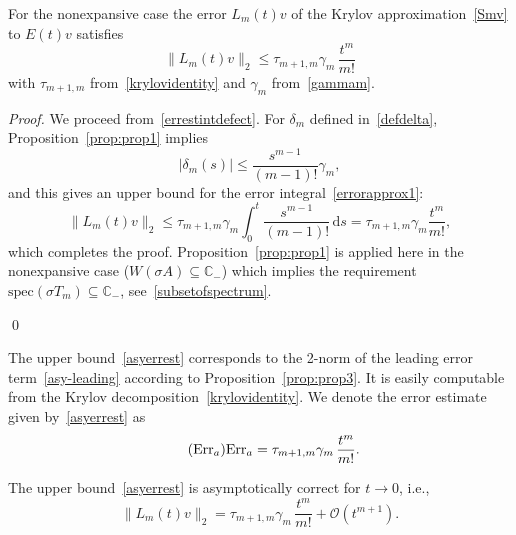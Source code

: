 \documentclass[smallextended]{svjour3pre}%
\numberwithin{equation}{section}
\numberwithin{figure}{section}
\numberwithin{table}{section}
\newcommand{\C}{\mathbb C}%
\newcommand{\divdif}[2]{#2[#1]}
\newcommand\tjnew[1]{{#1}}
\newcommand{\dd}{\mathrm{d}}
\newcommand{\ee}{{\rm e}}
\newcommand{\ii}{{\rm i}}
\newcommand\Era{\mathrm{Err}_a}
\newcommand\sca{\sigma}
\begin{document}
\begin{theorem}\label{theorem:upperboundexp}

\noindent
For the nonexpansive case the error $ L_m(t)v $ of the Krylov approximation~\eqref{Smv}
to $ E(t)v $ satisfies
\begin{equation} \label{asyerrest}
\| L_m(t)v \|_2 \leq \tau_{m+1,m}\gamma_m\,\frac{t^{m}}{m!}
\end{equation}
with $ \tau_{m+1,m} $ from~\eqref{krylovidentity} and
$ \gamma_m $ from~\eqref{gammam}.
\end{theorem}
\begin{proof}
We proceed from~\eqref{errestintdefect}.
For $ \delta_m $ defined in~\eqref{defdelta},
Proposition~\ref{prop:prop1} implies
\begin{equation*}
|\delta_m(s)|
\leq \frac{s^{m-1}}{(m-1)!} \gamma_m,
\end{equation*}
and this gives an upper bound for the error
integral~\eqref{errorapprox1}:
\begin{equation*}
\|L_m(t)v\|_2 \leq
\tau_{m+1,m} \gamma_m \int_0^t \frac{s^{m-1}}{(m-1)!}\,\dd s
= \tau_{m+1,m}\gamma_m \frac{t^{m}}{m!},
\end{equation*}
which completes the proof. 
\tjnew{
Proposition~\ref{prop:prop1} is applied here in the nonexpansive case ($ W(\sigma A) \subseteq \C_- $)
which implies the requirement $ \text{spec}(\sca T_m) \subseteq \C_- $, see~\eqref{subsetofspectrum}.}

\qed
\end{proof}

The upper bound~\eqref{asyerrest} corresponds to the 2-norm of the
leading error term~\eqref{asy-leading} according to Proposition~\ref{prop:prop3}.
It is easily computable
from the \tjnew{Krylov} decomposition~\eqref{krylovidentity}.
We denote the error estimate given by~\eqref{asyerrest} as
\begin{equation}\label{errornew}\tag{$\Era$}
\Era = \tau_{m+1,m}\gamma_m\,\frac{t^{m}}{m!}.
\end{equation}
\begin{proposition}\label{prop:prop4}

\noindent
The upper bound~\eqref{asyerrest} is asymptotically correct
for $ t \to 0 $, i.e.,
\begin{equation} \label{asyerrcorr}
\| L_m(t)v \|_2 = \tau_{m+1,m}\gamma_m\,\frac{t^m}{m!} + {\mathcal{O}}(t^{m+1}).
\end{equation}
\end{proposition}
\end{document}

